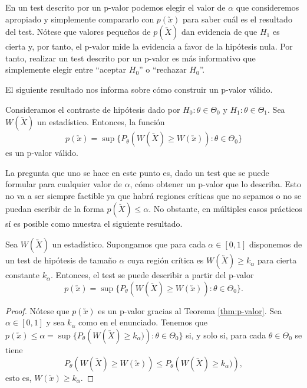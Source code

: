         En un test descrito por un p-valor podemos elegir el valor de $\alpha$ que consideremos apropiado y simplemente compararlo con $p(\utilde{x})$ para saber cuál es el resultado del test. Nótese que valores pequeños de $p(\utilde{X})$ dan evidencia de que $H_1$ es cierta y, por tanto, el p-valor mide la evidencia a favor de la hipótesis nula. Por tanto, realizar un test descrito por un p-valor es más informativo que simplemente elegir entre ``aceptar $H_0$'' o ``rechazar $H_0$''.

        El siguiente resultado nos informa sobre cómo construir un p-valor válido.

        \begin{thm} \label{thm:p-valor}
            Consideramos el contraste de hipótesis dado por $H_0: \theta \in \Theta_0$ y $H_1: \theta \in \Theta_1$. Sea $W(\utilde{X})$ un estadístico. Entonces, la función
            \[p(\utilde{x}) = \sup\{P_\theta(W(\utilde{X}) \ge W(\utilde{x})): \theta \in \Theta_0\}\]
            es un p-valor válido.
        \end{thm}

        La pregunta que uno se hace en este punto es, dado un test que se puede formular para cualquier valor de $\alpha$, cómo obtener un p-valor que lo describa. Esto no va a ser siempre factible ya que habrá regiones críticas que no sepamos o no se puedan escribir de la forma $p(\utilde{X}) \le \alpha$. No obstante, en múltiples casos prácticos sí es posible como muestra el siguiente resultado. %

        \begin{thm} \label{thm:p-valor:2}
            Sea $W(\utilde{X})$ un estadístico. Supongamos que para cada $\alpha \in [0,1]$ disponemos de un test de hipótesis de tamaño $\alpha$ cuya región crítica es $W(\utilde{X}) \ge k_\alpha$ para cierta constante $k_\alpha$. Entonces, el test se puede describir a partir del p-valor
           \[p(\utilde{x}) = \sup\{P_{\theta}\left(W(\utilde{X}) \ge W(\utilde{x})\right): \theta \in \Theta_0\}.\]
       \end{thm}
        \begin{proof}
            Nótese que $p(\utilde{x})$ es un p-valor gracias al Teorema \ref{thm:p-valor}. Sea $\alpha \in [0,1]$ y sea $k_\alpha$ como en el enunciado. Tenemos que $p(\utilde{x}) \le \alpha = \sup\{P_{\theta}\left(W(\utilde{X}) \ge k_\alpha)\right): \theta \in \Theta_0\}$ si, y solo si, para cada $\theta \in \Theta_0$ se tiene
            \[P_{\theta}\left(W(\utilde{X}) \ge W(\utilde{x})\right) \le P_{\theta}\left(W(\utilde{X}) \ge k_\alpha)\right) ,\]
            esto es, $W(\utilde{x}) \ge k_\alpha$.
        \end{proof}

